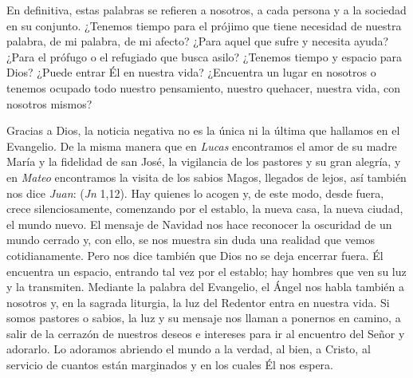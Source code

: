 \begin{body}
\begin{body}
En definitiva, estas palabras se refieren a nosotros, a cada persona y a la sociedad en su conjunto. ¿Tenemos tiempo para el prójimo que tiene necesidad de nuestra palabra, de mi palabra, de mi afecto? ¿Para aquel que sufre y necesita ayuda? ¿Para el prófugo o el refugiado que busca asilo? ¿Tenemos tiempo y espacio para Dios? ¿Puede entrar Él en nuestra vida? ¿Encuentra un lugar en nosotros o tenemos ocupado todo nuestro pensamiento, nuestro quehacer, nuestra vida, con nosotros mismos?

Gracias a Dios, la noticia negativa no es la única ni la última que hallamos en el Evangelio. De la misma manera que en \emph{Lucas} encontramos el amor de su madre María y la fidelidad de san José, la vigilancia de los pastores y su gran alegría, y en \emph{Mateo} encontramos la visita de los sabios Magos, llegados de lejos, así también nos dice \emph{Juan}:  (\emph{Jn} 1,12). Hay quienes lo acogen y, de este modo, desde fuera, crece silenciosamente, comenzando por el establo, la nueva casa, la nueva ciudad, el mundo nuevo. El mensaje de Navidad nos hace reconocer la oscuridad de un mundo cerrado y, con ello, se nos muestra sin duda una realidad que vemos cotidianamente. Pero nos dice también que Dios no se deja encerrar fuera. Él encuentra un espacio, entrando tal vez por el establo; hay hombres que ven su luz y la transmiten. Mediante la palabra del Evangelio, el Ángel nos habla también a nosotros y, en la sagrada liturgia, la luz del Redentor entra en nuestra vida. Si somos pastores o sabios, la luz y su mensaje nos llaman a ponernos en camino, a salir de la cerrazón de nuestros deseos e intereses para ir al encuentro del Señor y adorarlo. Lo adoramos abriendo el mundo a la verdad, al bien, a Cristo, al servicio de cuantos están marginados y en los cuales Él nos espera.


\end{body}
\end{body}
